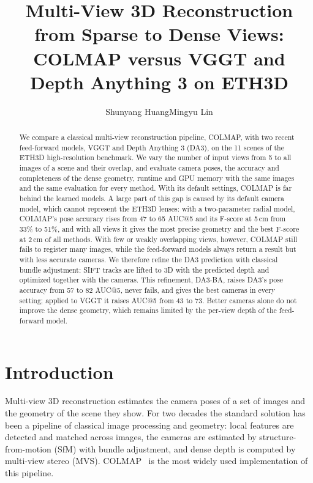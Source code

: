 \documentclass[10pt,twocolumn,letterpaper]{article}
\title{Multi-View 3D Reconstruction from Sparse to Dense Views:\\
COLMAP versus VGGT and Depth Anything 3 on ETH3D}
\author{Shunyang Huang\qquad Mingyu Lin}
\begin{document}
\maketitle

\begin{abstract}
We compare a classical multi-view reconstruction pipeline, COLMAP, with two recent feed-forward models, VGGT
and Depth Anything 3 (DA3), on the 11 scenes of the ETH3D high-resolution benchmark. We vary the number of
input views from 5 to all images of a scene and their overlap, and evaluate camera poses, the accuracy and
completeness of the dense geometry, runtime and GPU memory with the same images and the same evaluation for
every method. With its default settings, COLMAP is far behind the learned models. A large part of this gap is
caused by its default camera model, which cannot represent the ETH3D lenses: with a two-parameter radial model,
COLMAP's pose accuracy rises from 47 to 65 AUC@5 and its F-score at 5\,cm from 33\% to 51\%, and with all views
it gives the most precise geometry and the best F-score at 2\,cm of all methods. With few or weakly overlapping views, however, COLMAP still
fails to register many images, while the feed-forward models always return a result but with less accurate
cameras. We therefore refine the DA3 prediction with classical bundle adjustment: SIFT tracks are lifted to 3D
with the predicted depth and optimized together with the cameras. This refinement, DA3-BA, raises DA3's pose
accuracy from 57 to 82 AUC@5, never fails, and gives the best cameras in every setting; applied to VGGT it raises
AUC@5 from 43 to 73. Better cameras alone do not improve the dense geometry, which remains limited by the
per-view depth of the feed-forward model.
\end{abstract}

\section{Introduction}

Multi-view 3D reconstruction estimates the camera poses of a set of images and the geometry of the scene
they show. For two decades the standard solution has been a pipeline of classical image processing and
geometry: local features are detected and matched across images, the cameras are estimated by
structure-from-motion (SfM) with bundle adjustment, and dense depth is computed by multi-view stereo (MVS).
COLMAP~\cite{schonberger2016sfm,schonberger2016mvs} is the most widely used implementation of this pipeline.
\end{document}

